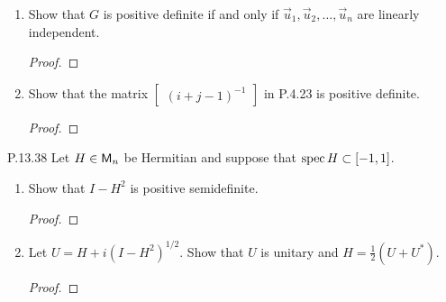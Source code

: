 \documentclass{../homework}
\begin{document}
\begin{problems}
\begin{enumerate}
    \begin{solution}
      \begin{proof}

      \end{proof}
    \end{solution}

  \item Show that \(G\) is positive definite if and only if
    \(\vec u_1, \vec u_2, \dots, \vec u_n\) are linearly independent.

    \begin{solution}
      \begin{proof}

      \end{proof}
    \end{solution}

  \item Show that the matrix
    \(\begin{bmatrix} (i + j - 1)^{-1} \end{bmatrix}\) in P.4.23 is
    positive definite.

    \begin{solution}
      \begin{proof}

      \end{proof}
    \end{solution}
  \end{enumerate}

\item[P.13.38] Let \(H \in \mathsf{M}_n\) be Hermitian and suppose that
  \(\operatorname{spec} H \subset [-1, 1]\).

  \begin{enumerate}
  \item Show that \(I - H^2\) is positive semidefinite.

    \begin{solution}
      \begin{proof}

      \end{proof}
    \end{solution}

  \item Let \(U = H + i(I - H^2)^{1/2}\).  Show that \(U\) is unitary
    and \(H = \frac{1}{2}(U + U^*)\).

    \begin{solution}
      \begin{proof}

      \end{proof}
    \end{solution}
  \end{enumerate}


\end{problems}
\end{document}
